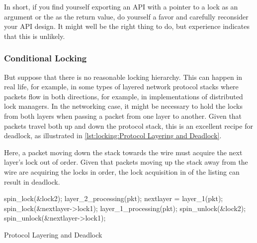 In short, if you find yourself exporting an API with a pointer to a
lock as an argument or the as the return value, do yourself a favor and
carefully reconsider your API design.
It might well be the right thing to do, but experience indicates that
this is unlikely.

\subsubsection{Conditional Locking}
\label{sec:locking:Conditional Locking}

But suppose that there is no reasonable locking hierarchy.
This can happen in real life, for example, in some types of layered
network protocol stacks where packets flow in both directions, for
example, in implementations of distributed lock managers.
In the networking case, it might be necessary to hold the locks from
both layers when passing a packet from one layer to another.
Given that packets travel both up and down the protocol stack, this
is an excellent recipe for deadlock, as illustrated in
\cref{lst:locking:Protocol Layering and Deadlock}.
\begin{fcvref}
Here, a packet moving down the stack towards the wire must acquire
the next layer's lock out of order.
Given that packets moving up the stack away from the wire are acquiring
the locks in order, the lock acquisition in  of the listing
can result in deadlock.
\end{fcvref}

\begin{listing}
\begin{fcvlabel}
\begin{VerbatimL}[commandchars=\\\{\}]
spin_lock(&lock2);
layer_2_processing(pkt);
nextlayer = layer_1(pkt);
spin_lock(&nextlayer->lock1);	
layer_1_processing(pkt);
spin_unlock(&lock2);
spin_unlock(&nextlayer->lock1);
\end{VerbatimL}
\end{fcvlabel}
\caption{Protocol Layering and Deadlock}
\label{lst:locking:Protocol Layering and Deadlock}
\end{listing}

